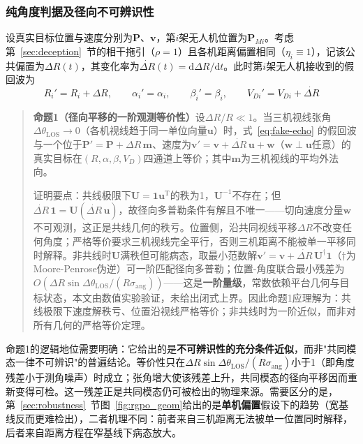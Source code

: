 \documentclass[UTF8,a4paper,zihao=-4]{ctexart}
\begin{document}
\subsubsection{纯角度判据及径向不可辨识性}\label{sec:angle-limit}
设真实目标位置与速度分别为\(\boldsymbol P\)、\(\boldsymbol v\)，第\(i\)架无人机位置为\(\boldsymbol P_{Mi}\)。考虑第~\ref{sec:deception}~节的相干拖引（\(\rho=1\)）且各机距离偏置相同（\(\eta_i\equiv1\)），记该公共偏置为\(\Delta R(t)\)，其变化率为\(\dot{\Delta R}(t)=\mathrm{d}\Delta R/\mathrm{d}t\)。此时第\(i\)架无人机接收到的假回波为
\begin{equation}
R_i'=R_i+\Delta R,\qquad \alpha_i'=\alpha_i,\qquad \beta_i'=\beta_i,\qquad V_{Di}'=V_{Di}+\dot{\Delta R}
\label{eq:fake-echo}
\end{equation}

\begin{quote}
\textbf{命题1（径向平移的一阶观测等价性）}\quad 设\(\Delta R/R\ll1\)。当三机视线张角\(\Delta\theta_{\mathrm{LOS}}\to0\)（各机视线趋于同一单位向量\(\boldsymbol u\)）时，式~\eqref{eq:fake-echo} 的假回波与一个位于\(\boldsymbol P'=\boldsymbol P+\Delta R\,\boldsymbol m\)、速度为\(\boldsymbol v'=\boldsymbol v+\dot{\Delta R}\,\boldsymbol u+\boldsymbol w\)（\(\boldsymbol w\perp\boldsymbol u\)任意）的真实目标在\((R,\alpha,\beta,V_D)\)四通道上等价；其中\(\boldsymbol m\)为三机视线的平均外法向。

证明要点：共线极限下\(\boldsymbol U=\mathbf 1\boldsymbol u^{\mathrm T}\)的秩为1，\(\boldsymbol U^{-1}\)不存在；但\(\dot{\Delta R}\,\mathbf 1=\boldsymbol U(\dot{\Delta R}\,\boldsymbol u)\)，故径向多普勒条件有解且不唯一——切向速度分量\(\boldsymbol w\)不可观测，这正是共线几何的秩亏。位置侧，沿共同视线平移\(\Delta R\)不改变任何角度；严格等价要求三机视线完全平行，否则三机距离不能被单一平移同时解释。非共线时\(\boldsymbol U\)满秩但可能病态，取最小范数解\(\boldsymbol v'=\boldsymbol v+\dot{\Delta R}\,\boldsymbol U^{\dagger}\mathbf 1\)（\(\dagger\)为Moore-Penrose伪逆）可一阶匹配径向多普勒；位置-角度联合最小残差为\(O(\Delta R\sin\Delta\theta_{\mathrm{LOS}}/(R\sigma_{\mathrm{ang}}))\)——这是\textbf{一阶量级}，常数依赖平台几何与目标状态，本文由数值实验验证，未给出闭式上界。因此命题1应理解为：共线极限下速度解秩亏、位置沿视线严格等价；非共线时为一阶近似，而非对所有几何的严格等价定理。
\end{quote}

命题1的逻辑地位需要明确：它给出的是\textbf{不可辨识性的充分条件近似}，而非"共同模态一律不可辨识"的普遍结论。等价性只在\(\Delta R\sin\Delta\theta_{\mathrm{LOS}}/(R\sigma_{\mathrm{ang}})\)小于1（即角度残差小于测角噪声）时成立；张角增大使该残差上升，共同模态的径向平移因而重新变得可检。这一残差正是共同模态仍可被检出的物理来源。需要区分的是，第~\ref{sec:robustness}~节图~\ref{fig:rgpo_geom}给出的是\textbf{单机偏置}假设下的趋势（宽基线反而更难检出），二者机理不同：前者来自三机距离无法被单一位置同时解释，后者来自距离方程在窄基线下病态放大。
\end{document}
